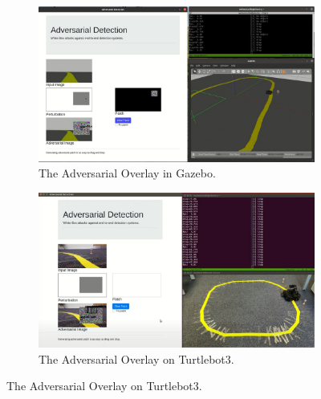 \begin{figure}[H]
\centering
\begin{subfigure}[b]{\textwidth}
    \centering
    \includegraphics[width=\textwidth]{figures/chapter_detection/detection/gazebo.jpg}
    \caption{The Adversarial Overlay in Gazebo.}
    \label{fig:gazebo}
\end{subfigure}
\begin{subfigure}[b]{\textwidth}
    \centering
    \includegraphics[width=\textwidth]{figures/chapter_detection/detection/turtlebot.jpg}
    \caption{The Adversarial Overlay on Turtlebot3.}
    \label{fig:turtlebot}
\end{subfigure}
\end{figure}
